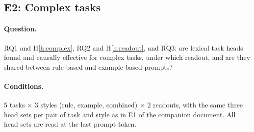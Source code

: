 \documentclass[11pt,a4paper]{article}
\begin{document}
\subsection{E2: Complex tasks}\label{sec:e2}
\paragraph{Question.} RQ1 and H\ref{h:complex}, RQ2 and H\ref{h:readout}, and RQ3: are lexical task heads found and causally effective for complex tasks, under which readout, and are they shared between rule-based and example-based prompts?

\paragraph{Conditions.} 5 tasks $\times$ 3 styles (rule, example, combined) $\times$ 2 readouts, with the same three head sets per pair of task and style as in E1 of the companion document. All head sets are read at the last prompt token.
\end{document}
